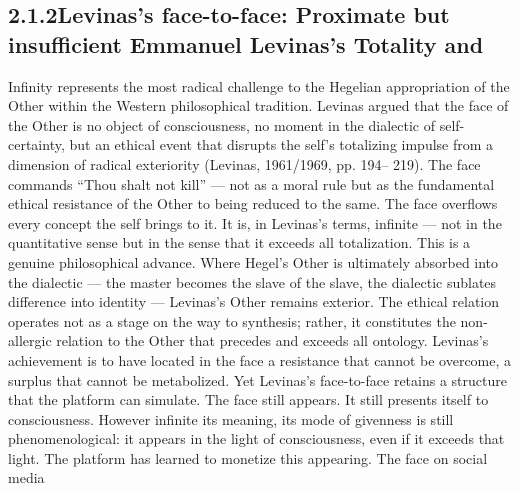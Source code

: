 \subsection{2.1.2\quad Levinas’s face-to-face: Proximate but insufficient Emmanuel Levinas’s Totality and}

Infinity represents the most radical challenge to the Hegelian appropriation of the Other within the Western philosophical tradition. Levinas argued that the face of the Other is no object of consciousness, no moment in the dialectic of self-certainty, but an ethical event that disrupts the self’s totalizing impulse from a dimension of radical exteriority (Levinas, 1961/1969, pp. 194– 219). The face commands “Thou shalt not kill” — not as a moral rule but as the fundamental ethical resistance of the Other to being reduced to the same. The face overflows every concept the self brings to it. It is, in Levinas’s terms, infinite — not in the quantitative sense but in the sense that it exceeds all totalization. This is a genuine philosophical advance. Where Hegel’s Other is ultimately absorbed into the dialectic — the master becomes the slave of the slave, the dialectic sublates difference into identity — Levinas’s Other remains exterior. The ethical relation operates not as a stage on the way to synthesis; rather, it constitutes the non-allergic relation to the Other that precedes and exceeds all ontology. Levinas’s achievement is to have located in the face a resistance that cannot be overcome, a surplus that cannot be metabolized. Yet Levinas’s face-to-face retains a structure that the platform can simulate. The face still appears. It still presents itself to consciousness. However infinite its meaning, its mode of givenness is still phenomenological: it appears in the light of consciousness, even if it exceeds that light. The platform has learned to monetize this appearing. The face on social media

